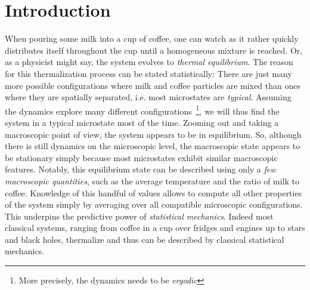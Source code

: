 \chapter*{Introduction}
\label{pt:introduction}
When pouring some milk into a cup of coffee, one can watch as it rather quickly distributes itself throughout the cup until a homogeneous mixture is reached. Or, as a physicist might say, the system evolves to \emph{thermal equilibrium}. The reason for this thermalization process can be stated statistically: There are just many more possible configurations where milk and coffee particles are mixed than ones where they are spatially separated, i.e. most microstates are \emph{typical}. Assuming the dynamics explore many different configurations~\footnote{More precisely, the dynamics needs to be \emph{ergodic}},
we will thus find the system in a typical microstate most of the time. Zooming out and taking a macroscopic point of view, the system appears to be in equilibrium. So, although there is still dynamics on the microscopic level, the macroscopic state appears to be stationary simply because most microstates exhibit similar macroscopic features. Notably, this equilibrium state can be described using only a \emph{few macroscopic quantities}, such as the average temperature and the ratio of milk to coffee.
Knowledge of this handful of values allows to compute all other properties of the system simply by averaging over all compatible microscopic configurations. This underpins the predictive power of \emph{statistical mechanics}. Indeed most classical systems, ranging from coffee in a cup over fridges and engines up to stars and black holes, thermalize and thus can be described by classical statistical mechanics.
